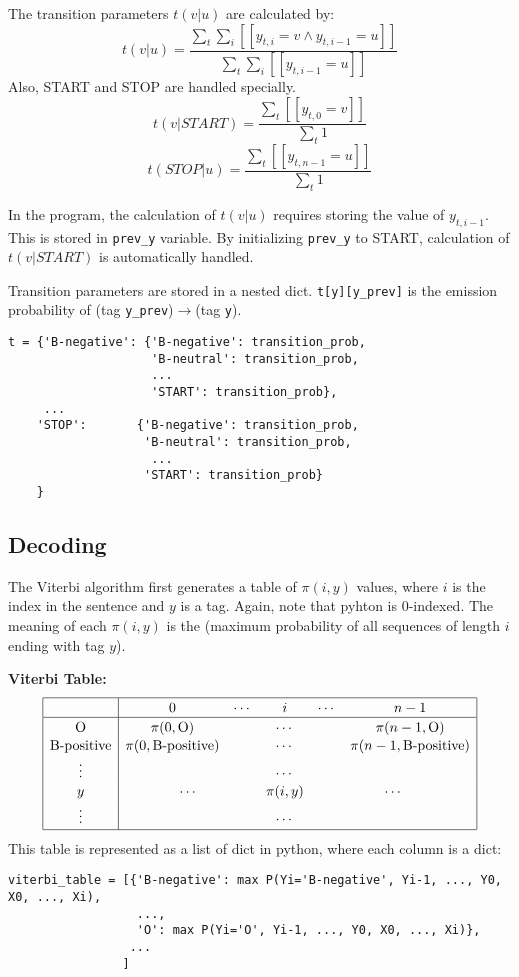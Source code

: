 \documentclass[12pt]{article}
\begin{document}
The transition parameters \(t(v|u)\) are calculated by:
\[ t(v|u) = \frac{\sum_t \sum_i [[y_{t,i}=v \land y_{t,i-1}=u]] }{\sum_{t} \sum_i [[y_{t,i-1}=u]] } \]
Also, START and STOP are handled specially.
\[ t(v|START) = \frac{\sum_t [[y_{t,0}=v]] }{\sum_{t} 1 } \]
\[ t(STOP|u) = \frac{\sum_t [[y_{t,n-1}=u]] }{\sum_{t} 1 } \]

In the program, the calculation of \(t(v|u)\) requires storing the value of \(y_{t,i-1}\). This is stored in \verb|prev_y| variable. By initializing \verb|prev_y| to START, calculation of \(t(v|START)\) is automatically handled.

Transition parameters are stored in a nested dict. \verb|t[y][y_prev]| is the emission probability of (tag \verb|y_prev|)\(\rightarrow\)(tag \verb|y|).

\begin{verbatim}
t = {'B-negative': {'B-negative': transition_prob,
                    'B-neutral': transition_prob,
                    ...
                    'START': transition_prob},
     ...
    'STOP':       {'B-negative': transition_prob,
                   'B-neutral': transition_prob,
                    ...
                   'START': transition_prob}
    }
\end{verbatim}

\subsection{Decoding}

The Viterbi algorithm first generates a table of \(\pi(i,y)\) values, where \(i\) is the index in the sentence and \(y\) is a tag. Again, note that pyhton is 0-indexed. The meaning of each \(\pi(i,y)\) is the (maximum probability of all sequences of length \(i\) ending with tag \(y\)).

\textbf{Viterbi Table:}
\[
\begin{array}{|c|ccccc|}
\hline \rule{0pt}{1em}
& 0 & \cdots & i & \cdots & n-1 \\
\hline \rule{0pt}{1em}
\mbox{O}          & \pi(0,\mbox{O}) & \multicolumn{3}{c}{\cdots} & \pi(n-1,\mbox{O}) \\[0.1em]
\mbox{B-positive} & \pi(0,\mbox{B-positive}) & \multicolumn{3}{c}{\cdots} & \pi(n-1,\mbox{B-positive}) \\[0.1em]
\vdots &          & \multicolumn{3}{c}{\cdots} &            \\[0.1em]
y      & \multicolumn{2}{c}{\cdots} & \pi(i,y) & \multicolumn{2}{c|}{\cdots} \\[0.1em]
\vdots &          & \multicolumn{3}{c}{\cdots} &            \\[0.1em]
\hline
\end{array}
\]
This table is represented as a list of dict in python, where each column is a dict:
\begin{verbatim}
viterbi_table = [{'B-negative': max P(Yi='B-negative', Yi-1, ..., Y0, X0, ..., Xi),
                  ...,
                  'O': max P(Yi='O', Yi-1, ..., Y0, X0, ..., Xi)},
                 ...
                ]
\end{verbatim}
\end{document}
